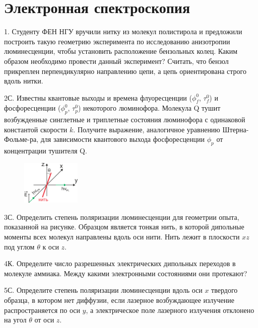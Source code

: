 \setmainfont{Noto Serif}
\setsansfont{Noto Sans}
\setmonofont{Noto Sans Mono}

\section{Электронная спектроскопия}
1. Студенту ФЕН НГУ вручили нитку из молекул полистирола и предложили построить такую геометрию эксперимента по исследованию анизотропии люминесценции, чтобы установить расположение бензольных колец. Каким образом необходимо провести данный эксперимент? Считать, что бензол прикреплен перпендикулярно направлению цепи, а цепь ориентирована строго вдоль нитки.
\par
2С. Известны квантовые выходы и времена флуоресценции ($\phi_f^0$, $\tau_f^0$) и фосфоресценции ($\phi_p^0$, $\tau_p^0$) некоторого люминофора. Молекула Q тушит возбужденные синглетные и триплетные состояния люминофора с одинаковой константой скорости $k$. Получите выражение, аналогичное уравнению Штерна-Фольме-ра, для зависимости квантового выхода фосфоресценции $\phi_p$ от концентрации тушителя Q.
\par
\begin{figure} %
    \centering
    \vspace{-4.2ex}
    \includegraphics[width=28mm]{images/Fig_2_3_3.png}
    \vspace{-5ex}
\end{figure}
3С. Определить степень поляризации люминесценции для геометрии опыта, показанной на рисунке. Образцом является тонкая нить, в которой дипольные моменты всех молекул направлены вдоль оси нити. Нить лежит в плоскости $xz$ под углом $\theta$ к оси $z$.
\par
4К. Определите число разрешенных электрических дипольных переходов в молекуле аммиака. Между какими электронными состояниями они протекают?
\par
5С. Определите степень поляризации люминесценции вдоль оси $x$ твердого образца, в котором нет диффузии, если лазерное возбуждающее излучение распространяется по оси $y$, а электрическое поле лазерного излучения отклонено на угол $\theta$ от оси $z$.
\par
